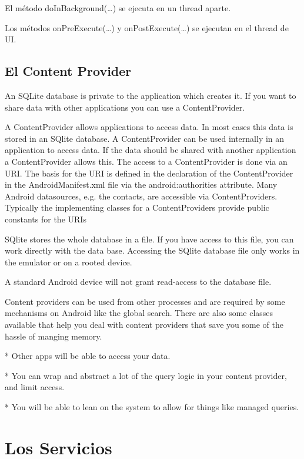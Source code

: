 El método doInBackground(…) se ejecuta en un thread  aparte.

Los métodos onPreExecute(…)  y onPostExecute(…) se  ejecutan en el thread de UI. 

\subsection{El Content Provider}
\label{subsec:dev.contentProvider}

An SQLite database is private to the application which creates it. If you want to share data with other applications you can use a ContentProvider.

A ContentProvider allows applications to access data. In most cases this data is stored in an SQlite database.
A ContentProvider can be used internally in an application to access data. If the data should be shared with another application a ContentProvider allows this.
The access to a ContentProvider is done via an URI. The basis for the URI is defined in the declaration of the ContentProvider in the AndroidManifest.xml file via the android:authorities attribute.
Many Android datasources, e.g. the contacts, are accessible via ContentProviders. Typically the implementing classes for a ContentProviders provide public constants for the URIs

SQlite stores the whole database in a file. If you have access to this file, you can work directly with the data base. Accessing the SQlite database file only works in the emulator or on a rooted device.

A standard Android device will not grant read-access to the database file.

Content providers can be used from other processes and are required by some mechanisms on Android like the global search. There are also some classes available that help you deal with content providers that save you some of the hassle of manging memory.

   * Other apps will be able to access your data.

   * You can wrap and abstract a lot of the query logic in your content provider, and limit access.

   * You will be able to lean on the system to allow for things like managed queries.

\section{Los Servicios}
\label{sec:services}

